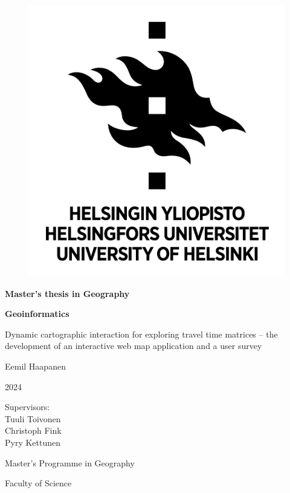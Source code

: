 \newcommand{\mytitle}{%
Dynamic cartographic interaction for exploring travel time matrices --
the development of an interactive web map application and a user survey
}

\begin{center}{
    \begin{figure}[H]
        \centering
        \includegraphics[scale=0.4]{visual/other/helsinki_uni_logo.jpg}
    \end{figure}

    \bigskip
    \bigskip
    \bigskip
    \textbf{Master's thesis in Geography} \par
    \textbf{Geoinformatics} \par

    \bigskip
    \bigskip
    \mytitle

    \bigskip
    \bigskip
    Eemil Haapanen

    2024

    \vfill

    Supervisors: \\
    Tuuli Toivonen \\
    Christoph Fink \\
    Pyry Kettunen \par
    \bigskip
    \bigskip
    \bigskip
    Master's Programme in Geography \par
    Faculty of Science \par
}
\end{center}
